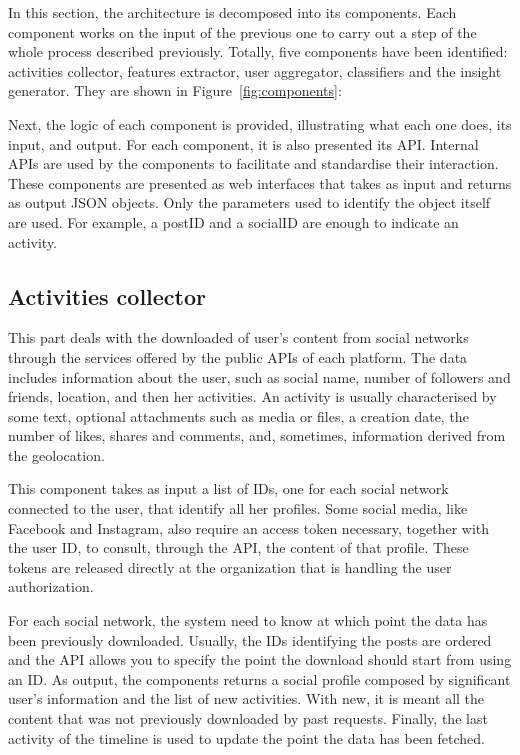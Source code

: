 In this section, the architecture is decomposed into its components. Each component works on the input of the previous one to carry out a step of the whole process described previously.
Totally, five components have been identified: activities collector, features extractor, user aggregator, classifiers and the insight generator. They are shown in Figure~\ref{fig:components}:


Next, the logic of each component is provided, illustrating what each one does, its input, and output.
For each component, it is also presented its API. Internal APIs are used by the components to facilitate and standardise their interaction.
These components are presented as web interfaces that takes as input and returns as output JSON objects.
Only the parameters used to identify the object itself are used. For example, a postID and a socialID are enough to indicate an activity.

\subsection{Activities collector}
This part deals with the downloaded of user's content from social networks through the services offered by the public APIs of each platform.
The data includes information about the user, such as social name, number of followers and friends, location, and then her activities.
An activity is usually characterised by some text, optional attachments such as media or files, a creation date, the number of likes, shares and comments, and, sometimes, information derived from the geolocation.

This component takes as input a list of IDs, one for each social network connected to the user, that identify all her profiles. Some social media, like Facebook and Instagram, also require an access token necessary, together with the user ID, to consult, through the API, the content of that profile.
These tokens are released directly at the organization that is handling the user authorization.

For each social network, the system need to know at which point the data has been previously downloaded. Usually, the IDs identifying the posts are ordered and the API allows you to specify the point the download should start from using an ID.
As output, the components returns a social profile composed by significant user's information and the list of new activities. With new, it is meant all the content that was not previously downloaded by past requests.
Finally, the last activity of the timeline is used to update the point the data has been fetched.

